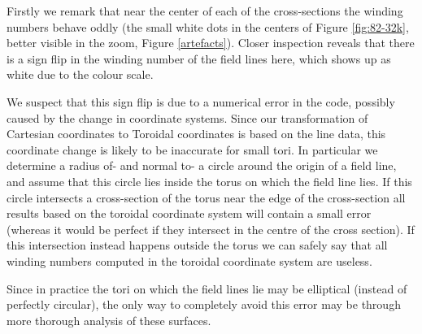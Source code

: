 \documentclass[a4paper]{article}
\begin{document}
Firstly we remark that near the center of each of the cross-sections the winding numbers behave oddly (the small white dots in the centers of Figure \ref{fig:82-32k}, better visible in the zoom, Figure \ref{artefacts}).
Closer inspection reveals that there is a sign flip in the winding number of the field lines here, which shows up as white due to the colour scale. 

We suspect that this sign flip is due to a numerical error in the code, possibly caused by the change in coordinate systems. 
Since our transformation of Cartesian coordinates to Toroidal coordinates is based on the line data, this coordinate change is likely to be inaccurate for small tori. 
In particular we determine a radius of- and normal to- a circle around the origin of a field line, and assume that this circle lies inside the torus on which the field line lies. If this circle intersects a cross-section of the torus near the edge of the cross-section all results based on the toroidal coordinate system will contain a small error (whereas it would be perfect if they intersect in the centre of the cross section). 
If this intersection instead happens outside the torus we can safely say that all winding numbers computed in the toroidal coordinate system are useless. 

Since in practice the tori on which the field lines lie may be elliptical (instead of perfectly circular), the only way to completely avoid this error may be through more thorough analysis of these surfaces.
\end{document}
